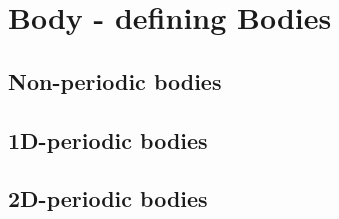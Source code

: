 \section{Body - defining Bodies}
\subsection{Non-periodic bodies}

\subsection{1D-periodic bodies}
\subsection{2D-periodic bodies}

